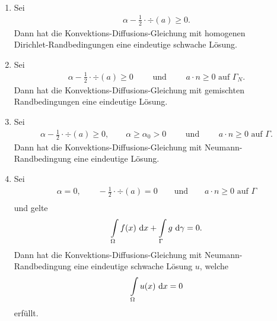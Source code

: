 \begin{theorem}\ 
\begin{enumerate}[label=(\roman*)]
\item Sei 
\begin{align*}
\alpha-\frac{1}{2}\cdot\div(a)\geq0.
\end{align*}
Dann hat die Konvektions-Diffusions-Gleichung mit homogenen\\ Dirichlet-Randbedingungen eine eindeutige schwache Lösung.
\item Sei 
\begin{align*}
\alpha-\frac{1}{2}\cdot\div(a)\geq0\qquad\text{ und }\qquad a\cdot n\geq0\text{ auf }\Gamma_N.
\end{align*}
Dann hat die Konvektions-Diffusions-Gleichung mit gemischten Randbedingungen eine eindeutige Lösung.
\item Sei 
\begin{align*}
\alpha-\frac{1}{2}\cdot\div(a)\geq0,\qquad \alpha\geq\alpha_0>0\qquad\text{ und }\qquad a\cdot n\geq 0\text{ auf }\Gamma.
\end{align*}
Dann hat die Konvektions-Diffusions-Gleichung mit Neumann-Randbedingung eine eindeutige Lösung.
\item Sei
\begin{align*}
\alpha=0,\qquad-\frac{1}{2}\cdot\div(a)=0\qquad\text{und}\qquad a\cdot n\geq 0\text{ auf }\Gamma\\
\end{align*}
und gelte
\begin{align*}
	\int\limits_\Omega f(x)\text{ d} x+\int\limits_\Gamma g\text{ d}\gamma=0.
\end{align*}
Dann hat die Konvektions-Diffusions-Gleichung mit Neumann-Randbedingung eine eindeutige schwache Lösung $u$, welche 
\begin{align*}
\int\limits_\Omega u(x)\text{ d} x=0
\end{align*}
erfüllt.
\end{enumerate}
\end{theorem}

